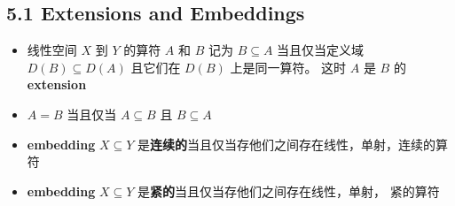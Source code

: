 
\subsection{5.1 Extensions and Embeddings}
\begin{itemize}
\item 线性空间 $X$ 到 $Y$ 的算符 $A$ 和 $B$ 记为 $B \subseteq A$ 当且仅当定义域 $D(B) \subseteq D(A)$ 且它们在 $D(B)$ 上是同一算符。 这时 $A$ 是 $B$ 的 \textbf{extension}

\item $A = B$ 当且仅当 $A\subseteq B$ 且 $B\subseteq A$

\item \textbf{embedding} $X \subseteq Y$ 是\textbf{连续的}当且仅当存他们之间存在线性，单射，连续的算符

\item \textbf{embedding} $X \subseteq Y$ 是\textbf{紧的}当且仅当存他们之间存在线性，单射， 紧的算符
\end{itemize}

